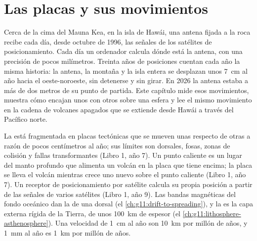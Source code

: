 \chapter{Las placas y sus movimientos}\label{ch:g11:plate-motions}

Cerca de la cima del Mauna Kea, en la isla de Hawái, una antena fijada a la
roca recibe cada día, desde octubre de 1996, las señales de los satélites de
posicionamiento. Cada día un ordenador calcula dónde está la antena, con una
precisión de pocos milímetros. Treinta años de posiciones cuentan cada año la
misma historia: la antena, la montaña y la isla entera se desplazan unos
\qty{7}{cm} al año hacia el oeste-noroeste, sin detenerse y sin girar. En 2026
la antena estaba a más de dos metros de su punto de partida. Este capítulo
mide esos movimientos, muestra cómo encajan unos con otros sobre una esfera y
lee el mismo movimiento en la cadena de volcanes apagados que se extiende desde
Hawái a través del Pacífico norte.

\begin{recall}
La  está fragmentada en placas tectónicas que se mueven unas respecto
de otras a razón de pocos centímetros al año; sus límites son dorsales, fosas,
zonas de colisión y fallas transformantes (Libro 1, año 7). Un punto caliente
es un lugar del manto profundo que alimenta un volcán en la placa que tiene
encima; la placa se lleva el volcán mientras crece uno nuevo sobre el punto
caliente (Libro 1, año 7). Un receptor de posicionamiento por satélite
calcula su propia posición a partir de las señales de varios satélites
(Libro 1, año 9). Las bandas magnéticas del fondo oceánico dan la  de una dorsal (el \cref{ch:g11:drift-to-spreading}), y la 
es la capa externa rígida de la Tierra, de unos \qty{100}{km} de espesor
(el \cref{ch:g11:lithosphere-asthenosphere}). Una velocidad de \qty{1}{cm} al
año son \qty{10}{km} por millón de años, y \qty{1}{mm} al año es \qty{1}{km}
por millón de años.
\end{recall}


